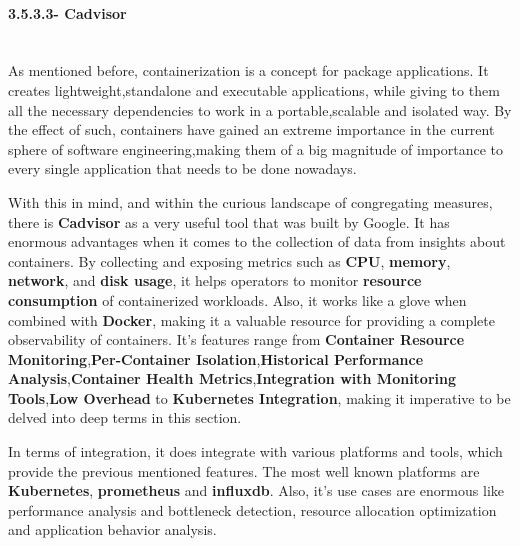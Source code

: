 \paragraph{3.5.3.3- Cadvisor}\mbox{}\\

As mentioned before, containerization is a concept for package applications. It creates lightweight,standalone  and executable applications, while giving to them all the necessary dependencies to work in a portable,scalable and isolated way. By the effect of such, containers have gained an extreme importance in the current sphere of software engineering,making them of a big magnitude of importance to every single application that needs to be done nowadays.

With this in mind, and within the curious landscape of congregating measures, there is \textbf{Cadvisor} as a very useful tool that was built by Google. It has enormous advantages when it comes to the collection of data from insights about containers. By collecting and exposing metrics such as \textbf{CPU}, \textbf{memory}, \textbf{network}, and \textbf{disk usage}, it helps operators to monitor \textbf{resource consumption} of containerized workloads. Also, it works like a glove when combined with \textbf{Docker}, making it a valuable resource for providing a complete observability of containers. It's features range from \textbf{Container Resource Monitoring},\textbf{Per-Container Isolation},\textbf{Historical Performance Analysis},\textbf{Container Health Metrics},\textbf{Integration with Monitoring Tools},\textbf{Low Overhead} to \textbf{Kubernetes Integration}, making it imperative to be delved into deep terms in this section.

In terms of integration, it does integrate with various platforms and tools, which provide the previous mentioned features. The most well known platforms are \textbf{Kubernetes}, \textbf{prometheus} and \textbf{influxdb}. Also, it's use cases are enormous like performance analysis and bottleneck detection, resource allocation optimization and application behavior analysis.

